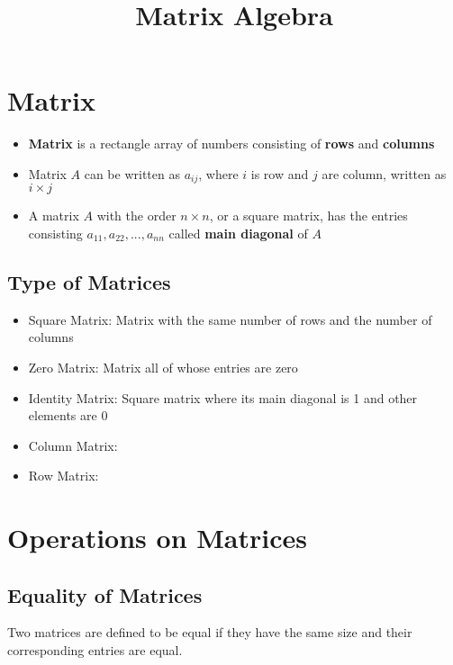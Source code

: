 \documentclass[a4paper,12pt]{article}
\begin{document}
\title{Matrix Algebra}

\section*{Matrix}
\begin{itemize}
  \item \textbf{Matrix} is a rectangle array of numbers consisting of \textbf{rows} and \textbf{columns}
  \item Matrix \(A\) can be written as \(a_{ij}\), where \(i\) is row and \(j\) are column, written as \(i\times j\)
  \item A matrix \(A\) with the order \(n \times n\), or a square matrix, has the entries consisting \(a_{11},a_{22},...,a_{nn}\) called \textbf{main diagonal} of \(A\)
\end{itemize}

\subsection*{Type of Matrices}
\begin{itemize}
  \item Square Matrix: Matrix with the same number of rows and the number of columns
  \item Zero Matrix: Matrix all of whose entries are zero
  \item Identity Matrix: Square matrix where its main diagonal is 1 and other elements are 0
  \item Column Matrix:
  \item Row Matrix:
\end{itemize}

\section*{Operations on Matrices}

\subsection*{Equality of Matrices}
Two matrices are defined to be equal if they have the same size and their corresponding entries are equal.
\end{document}
